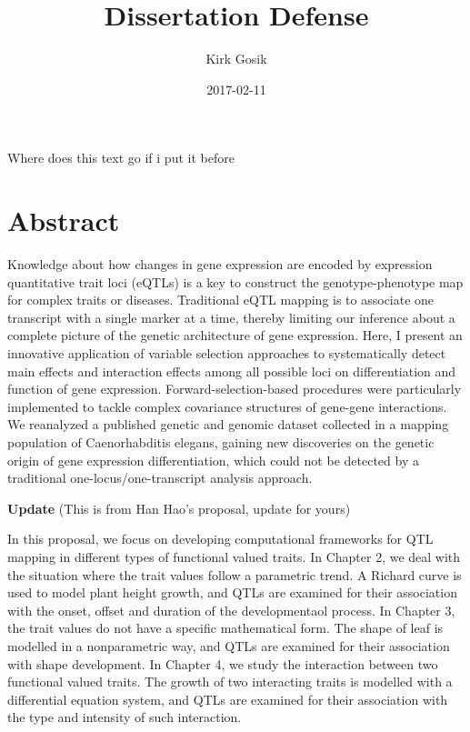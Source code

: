 \documentclass[]{book}
\title{Dissertation Defense}
\author{Kirk Gosik}
\date{2017-02-11}
\theoremstyle{definition}
\theoremstyle{definition}
\theoremstyle{remark}
\begin{document}
\maketitle

{
\setcounter{tocdepth}{1}
\tableofcontents
}
\listoffigures
Where does this text go if i put it before

\chapter*{Abstract}\label{abstract}

Knowledge about how changes in gene expression are encoded by expression
quantitative trait loci (eQTLs) is a key to construct the
genotype-phenotype map for complex traits or diseases. Traditional eQTL
mapping is to associate one transcript with a single marker at a time,
thereby limiting our inference about a complete picture of the genetic
architecture of gene expression. Here, I present an innovative
application of variable selection approaches to systematically detect
main effects and interaction effects among all possible loci on
differentiation and function of gene expression. Forward-selection-based
procedures were particularly implemented to tackle complex covariance
structures of gene-gene interactions. We reanalyzed a published genetic
and genomic dataset collected in a mapping population of Caenorhabditis
elegans, gaining new discoveries on the genetic origin of gene
expression differentiation, which could not be detected by a traditional
one-locus/one-transcript analysis approach.

\textbf{Update} (This is from Han Hao's proposal, update for yours)

In this proposal, we focus on developing computational frameworks for
QTL mapping in different types of functional valued traits. In Chapter
2, we deal with the situation where the trait values follow a parametric
trend. A Richard curve is used to model plant height growth, and QTLs
are examined for their association with the onset, offset and duration
of the developmentaol process. In Chapter 3, the trait values do not
have a specific mathematical form. The shape of leaf is modelled in a
nonparametric way, and QTLs are examined for their association with
shape development. In Chapter 4, we study the interaction between two
functional valued traits. The growth of two interacting traits is
modelled with a differential equation system, and QTLs are examined for
their association with the type and intensity of such interaction.
\end{document}
